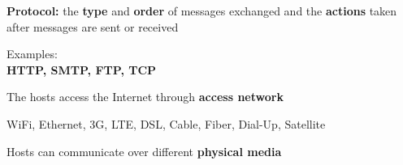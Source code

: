 \documentclass[20pt,handout,notes=show]{beamer}
\begin{document}
\begin{frame}
\begin{center}
\large
\textbf{Protocol:} the \textbf{type} and \textbf{order} of messages exchanged and the \textbf{actions} taken after messages are sent or received
\end{center}
\end{frame}

\begin{frame}
\begin{center}
\large
Examples:\\
\textbf{HTTP, SMTP, FTP, TCP}
\end{center}
\end{frame}

\begin{frame}
\begin{center}
\large
The hosts access the Internet through \textbf{access network}
\end{center}
\end{frame}

\begin{frame}\begin{center}
\large
WiFi, Ethernet, 3G, LTE, DSL, Cable, Fiber, Dial-Up, Satellite
\end{center}\end{frame}

\begin{frame}
\begin{center}
\large
Hosts can communicate over different \textbf{physical media}
\end{center}
\end{frame}

\begin{frame}[plain]\begin{center}
\end{center}\end{frame}
\end{document}
